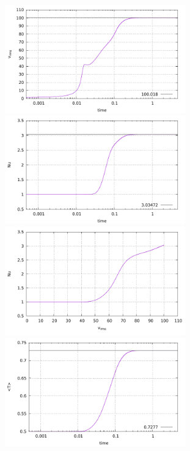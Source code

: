 \begin{center}
\includegraphics[width=7.8cm]{python_codes/fieldstone_28/results_case3/vrms.pdf}
\includegraphics[width=7.8cm]{python_codes/fieldstone_28/results_case3/Nu.pdf}\\
\includegraphics[width=7.8cm]{python_codes/fieldstone_28/results_case3/vrms_Nu.pdf}
\includegraphics[width=7.8cm]{python_codes/fieldstone_28/results_case3/Tavrg.pdf}
\end{center}

